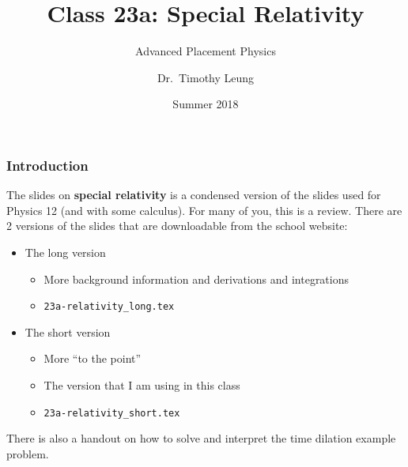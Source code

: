 \documentclass[12pt,compress,aspectratio=169]{beamer}
\title{Class 23a: Special Relativity}
\subtitle{Advanced Placement Physics}
\author[TML]{Dr.\ Timothy Leung}
\institute{Olympiads School}
\date{Summer 2018}
\begin{document}
\begin{frame}
  \maketitle
\end{frame}


\begin{frame}
  \frametitle{Introduction}
  The slides on \textbf{special relativity} is a condensed version of the
  slides used for Physics 12 (and with some calculus). For many of you, this is
  a review. There are 2 versions of the slides that are downloadable from
  the school website:
  \begin{itemize}
  \item The long version
    \begin{itemize}
    \item More background information and derivations and integrations
    \item \texttt{23a-relativity\_long.tex}
    \end{itemize}
  \item The short version
    \begin{itemize}
    \item More ``to the point''
    \item The version that I am using in this class
    \item \texttt{23a-relativity\_short.tex}
    \end{itemize}
  \end{itemize}
  There is also a handout on how to solve and interpret the time dilation
  example problem.
\end{frame}
\end{document}
